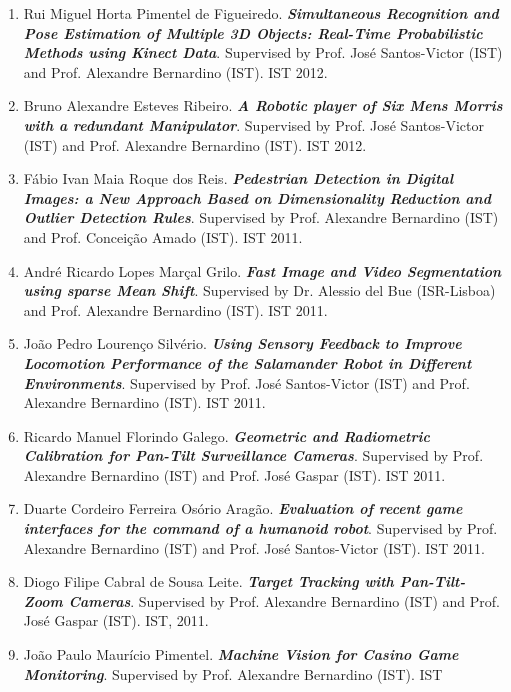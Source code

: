 \begin{enumerate}
  Filipe FernandesVeiga. \emph{\textbf{Robotic Grasp Optimisation from
  Contact Force Analysis}}. Supervised by Prof. Alexandre Bernardino
  (IST) and Prof. José Santos-Victor (IST). IST 2012.
\item
  Rui Miguel Horta Pimentel de Figueiredo. \emph{\textbf{Simultaneous
  Recognition and Pose Estimation of Multiple 3D Objects: Real-Time
  Probabilistic Methods using Kinect Data}}. Supervised by Prof. José
  Santos-Victor (IST) and Prof. Alexandre Bernardino (IST). IST 2012.
\item
  Bruno Alexandre Esteves Ribeiro. \emph{\textbf{A Robotic player of Six
  Men\textquotesingle s Morris with a redundant Manipulator}}.
  Supervised by Prof. José Santos-Victor (IST) and Prof. Alexandre
  Bernardino (IST). IST 2012.
\item
  Fábio Ivan Maia Roque dos Reis. \emph{\textbf{Pedestrian Detection in
  Digital Images: a New Approach Based on Dimensionality Reduction and
  Outlier Detection Rules}}. Supervised by Prof. Alexandre Bernardino
  (IST) and Prof. Conceição Amado (IST). IST 2011.
\item
  André Ricardo Lopes Marçal Grilo. \emph{\textbf{Fast Image and Video
  Segmentation using sparse Mean Shift}}. Supervised by Dr. Alessio del
  Bue (ISR-Lisboa) and Prof. Alexandre Bernardino (IST). IST 2011.
\item
  João Pedro Lourenço Silvério. \emph{\textbf{Using Sensory Feedback to
  Improve Locomotion Performance of the Salamander Robot in Different
  Environments}}. Supervised by Prof. José Santos-Victor (IST) and Prof.
  Alexandre Bernardino (IST). IST 2011.
\item
  Ricardo Manuel Florindo Galego. \emph{\textbf{Geometric and
  Radiometric Calibration for Pan-Tilt Surveillance Cameras}}.
  Supervised by Prof. Alexandre Bernardino (IST) and Prof. José Gaspar
  (IST). IST 2011.
\item
  Duarte Cordeiro Ferreira Osório Aragão. \emph{\textbf{Evaluation of
  recent game interfaces for the command of a humanoid robot}}.
  Supervised by Prof. Alexandre Bernardino (IST) and Prof. José
  Santos-Victor (IST). IST 2011.
\item
  Diogo Filipe Cabral de Sousa Leite. \emph{\textbf{Target Tracking with
  Pan-Tilt-Zoom Cameras}}. Supervised by Prof. Alexandre Bernardino
  (IST) and Prof. José Gaspar (IST). IST, 2011.
\item
  João Paulo Maurício Pimentel. \emph{\textbf{Machine Vision for Casino
  Game Monitoring}}. Supervised by Prof. Alexandre Bernardino (IST). IST

\end{enumerate}
